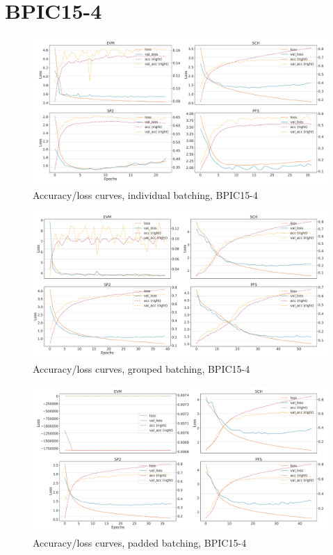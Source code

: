 \section*{BPIC15-4}
\begin{figure}[!htb]
    \centering
    \includegraphics[width=\textwidth]{gfx/bpic2015_4/individual_loss_acc_curve.pdf}
    \caption{Accuracy/loss curves, individual batching, BPIC15-4}
\end{figure}
\begin{figure}[!htb]
    \centering
    \includegraphics[width=\textwidth]{gfx/bpic2015_4/grouped_loss_acc_curve.pdf}
    \caption{Accuracy/loss curves, grouped batching, BPIC15-4}
\end{figure}
\begin{figure}[!htb]
    \centering
    \includegraphics[width=\textwidth]{gfx/bpic2015_4/padded_loss_acc_curve.pdf}
    \caption{Accuracy/loss curves, padded batching, BPIC15-4}
\end{figure}
